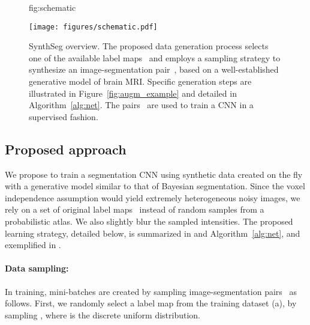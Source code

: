\documentclass{midl}
\newcommand{\netname}{SynthSeg}
\begin{document}
\begin{figure}[t]
\centering
\floatconts
  {fig:schematic}
  {
  \caption{\netname{} overview. The proposed data generation process selects one of the available label maps~ and employs a sampling strategy to synthesize an image-segmentation pair~, based on a well-established generative model of brain MRI. Specific generation steps are illustrated in Figure~\ref{fig:augm_example} and detailed in Algorithm~\ref{alg:net}. The pairs~ are used to train a CNN in a supervised fashion.}}
  {\texttt{[image: figures/schematic.pdf]} 
  }
\end{figure}
\begin{algorithm2e}[t]
\caption{Proposed Learning Strategy for \netname{}}
\label{alg:net}
\DontPrintSemicolon
{}
\end{algorithm2e}


\subsection{Proposed approach}
\label{sec:approach}

We propose to train a segmentation CNN using synthetic data created on the fly with a generative model similar to that of Bayesian segmentation. Since the voxel independence assumption would yield extremely heterogeneous noisy images, we rely on a set of  original label maps~ instead of random samples from a probabilistic atlas. We also slightly blur the sampled intensities. The proposed learning strategy, detailed below, is summarized in  and Algorithm~\ref{alg:net}, and exemplified in . \newline

\paragraph{Data sampling:} In training, mini-batches are created  by sampling image-segmentation pairs~ as follows. First, we randomly select a label map  from the training dataset (a), by sampling , where  is the discrete uniform distribution. 
\end{document}

